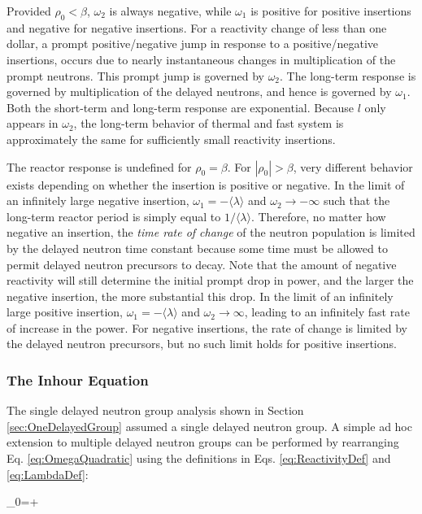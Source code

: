 Provided \(\rho_0<\beta\), \(\omega_2\) is always negative, while \(\omega_1\) is positive for positive insertions and negative for negative insertions. For a reactivity change of less than one dollar, a prompt positive/negative jump in response to a positive/negative insertions, occurs due to nearly instantaneous changes in multiplication of the prompt neutrons. This prompt jump is governed by \(\omega_2\). The long-term response is governed by multiplication of the delayed neutrons, and hence is governed by \(\omega_1\). Both the short-term and long-term response are exponential. Because \(l\) only appears in \(\omega_2\), the long-term behavior of thermal and fast system is approximately the same for sufficiently small reactivity insertions.

The reactor response is undefined for \(\rho_0=\beta\). For \(|\rho_0|>\beta\), very different behavior exists depending on whether the insertion is positive or negative. In the limit of an infinitely large negative insertion, \(\omega_1=-\langle\lambda\rangle\) and \(\omega_2\rightarrow-\infty\) such that the long-term reactor period is simply equal to \(1/\langle\lambda\rangle\). Therefore, no matter how negative an insertion, the {\it time rate of change} of the neutron population is limited by the delayed neutron time constant because some time must be allowed to permit delayed neutron precursors to decay. Note that the amount of negative reactivity will still determine the initial prompt drop in power, and the larger the negative insertion, the more substantial this drop. In the limit of an infinitely large positive insertion, \(\omega_1=-\langle\lambda\rangle\) and \(\omega_2\rightarrow\infty\), leading to an infinitely fast rate of increase in the power. For negative insertions, the rate of change is limited by the delayed neutron precursors, but no such limit holds for positive insertions.

\subsubsection{The Inhour Equation}
\label{sec:Inhour}

The single delayed neutron group analysis shown in Section \ref{sec:OneDelayedGroup} assumed a single delayed neutron group. A simple ad hoc extension to multiple delayed neutron groups can be performed by rearranging Eq. \eqref{eq:OmegaQuadratic} using the definitions in Eqs. \eqref{eq:ReactivityDef} and \eqref{eq:LambdaDef}:

\beq
\rho_0=+
\eeq

